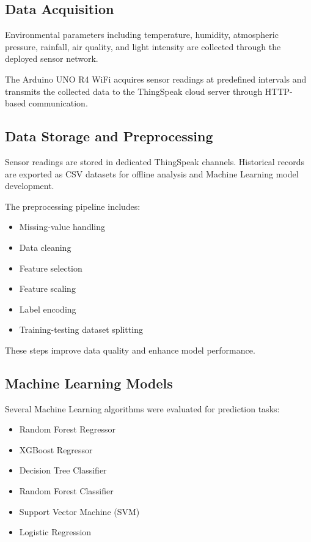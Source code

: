 \documentclass[conference]{IEEEtran}
\begin{document}
\subsection{Data Acquisition}

Environmental parameters including temperature, humidity, atmospheric pressure, rainfall, air quality, and light intensity are collected through the deployed sensor network.

The Arduino UNO R4 WiFi acquires sensor readings at predefined intervals and transmits the collected data to the ThingSpeak cloud server through HTTP-based communication.

\subsection{Data Storage and Preprocessing}

Sensor readings are stored in dedicated ThingSpeak channels. Historical records are exported as CSV datasets for offline analysis and Machine Learning model development.

The preprocessing pipeline includes:

\begin{itemize}
\item Missing-value handling
\item Data cleaning
\item Feature selection
\item Feature scaling
\item Label encoding
\item Training-testing dataset splitting
\end{itemize}

These steps improve data quality and enhance model performance.

\subsection{Machine Learning Models}

Several Machine Learning algorithms were evaluated for prediction tasks:

\begin{itemize}
\item Random Forest Regressor
\item XGBoost Regressor
\item Decision Tree Classifier
\item Random Forest Classifier
\item Support Vector Machine (SVM)
\item Logistic Regression
\end{itemize}
\end{document}
